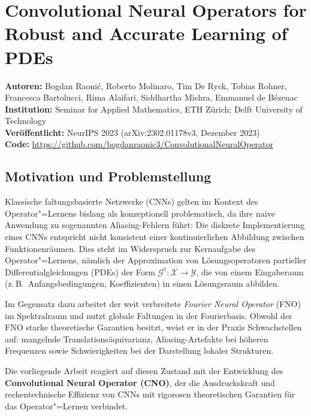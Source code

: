 \documentclass[a4paper,12pt]{article}
\begin{document}
\section*{Convolutional Neural Operators for Robust and Accurate
          Learning of PDEs}

\noindent\textbf{Autoren:} Bogdan Raoni\'c, Roberto Molinaro, Tim De Ryck,
Tobias Rohner, Francesca Bartolucci, Rima Alaifari, Siddhartha Mishra,
Emmanuel de B\'ezenac\\[2pt]
\textbf{Institution:} Seminar for Applied Mathematics, ETH Z\"urich;
Delft University of Technology\\[2pt]
\textbf{Ver\"offentlicht:} NeurIPS 2023 (arXiv:2302.01178v3, Dezember 2023)\\[2pt]
\textbf{Code:} \url{https://github.com/bogdanraonic3/ConvolutionalNeuralOperator}

\subsection*{Motivation und Problemstellung}

Klassische faltungsbasierte Netzwerke (CNNs) gelten im Kontext des
Operator"=Lernens bislang als konzeptionell problematisch, da ihre naive
Anwendung zu sogenannten Aliasing-Fehlern f\"uhrt: Die diskrete
Implementierung eines CNNs entspricht nicht konsistent einer kontinuierlichen
Abbildung zwischen Funktionenr\"aumen. Dies steht im Widerspruch zur
Kernaufgabe des Operator"=Lernens, n\"amlich der Approximation von
L\"osungsoperatoren partieller Differentialgleichungen (PDEs) der Form
$\mathcal{G}^\dagger\colon \mathcal{X} \to \mathcal{Y}$, die von einem
Eingaberaum (z.\,B.\ Anfangsbedingungen, Koeffizienten) in einen
L\"osungsraum abbilden.

Im Gegensatz dazu arbeitet der weit verbreitete \emph{Fourier Neural Operator}
(FNO) im Spektralraum und nutzt globale Faltungen in der Fourierbasis.
Obwohl der FNO starke theoretische Garantien besitzt, weist er in der Praxis
Schwachstellen auf: mangelnde Translationsäquivarianz, Aliasing-Artefakte bei
h\"oheren Frequenzen sowie Schwierigkeiten bei der Darstellung lokaler Strukturen.

Die vorliegende Arbeit reagiert auf diesen Zustand mit der Entwicklung des
\textbf{Convolutional Neural Operator (CNO)}, der die Ausdruckskraft und
rechentechnische Effizienz von CNNs mit rigorosen theoretischen Garantien
f\"ur das Operator"=Lernen verbindet.
\end{document}
